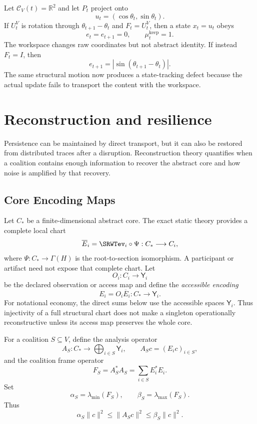 
Let \(\mathcal C_V(t)=\mathbb R^2\) and let \(P_t\) project onto
\[
u_t=(\cos\theta_t,\sin\theta_t).
\]
If \(U_t^V\) is rotation through
\(\theta_{t+1}-\theta_t\) and \(F_t=U_t^V\), then a state
\(x_t=u_t\) obeys
\[
e_t=e_{t+1}=0,
\qquad
\mu_t^{\mathrm{keep}}=1.
\]
The workspace changes raw coordinates but not abstract identity. If instead
\(F_t=I\), then
\[
e_{t+1}
=
|\sin(\theta_{t+1}-\theta_t)|.
\]
The same structural motion now produces a state-tracking defect because the
actual update fails to transport the content with the workspace.


\chapter{Reconstruction and resilience}\label{SRWT:book:chapter-77}


Persistence can be maintained by direct transport, but it can also be restored
from distributed traces after a disruption. Reconstruction theory quantifies
when a coalition contains enough information to recover the abstract core and
how noise is amplified by that recovery.

\section{Core Encoding Maps}

Let \(C_*\) be a finite-dimensional abstract core. The exact static theory
provides a complete local chart
\[
\overline E_i
=
\SRWTev_i\circ\Psi:C_*\longrightarrow C_i,
\]
where \(\Psi:C_*\to\Gamma(H)\) is the root-to-section isomorphism. A participant
or artifact need not expose that complete chart. Let
\[
O_i:C_i\longrightarrow\mathsf Y_i
\]
be the declared observation or access map and define the \emph{accessible
encoding}
\[
\boxed{
E_i=O_i\overline E_i:C_*\longrightarrow\mathsf Y_i.
}
\]
For notational economy, the direct sums below use the accessible spaces
\(\mathsf Y_i\). Thus injectivity of a full structural chart does not make a
singleton operationally reconstructive unless its access map preserves the
whole core.

For a coalition \(S\subseteq V\), define the analysis operator
\[
A_S:C_*\longrightarrow\bigoplus_{i\in S}\mathsf Y_i,
\qquad
A_Sc=(E_ic)_{i\in S},
\]
and the coalition frame operator
\[
\boxed{
F_S=A_S^*A_S=\sum_{i\in S}E_i^*E_i.
}
\]
Set
\[
\alpha_S=\lambda_{\min}(F_S),
\qquad
\beta_S=\lambda_{\max}(F_S).
\]
Thus
\[
\alpha_S\|c\|^2
\leq
\|A_Sc\|^2
\leq
\beta_S\|c\|^2.
\]

